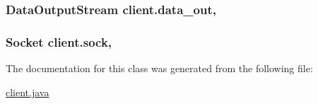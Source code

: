 \subsubsection[{\texorpdfstring{data\+\_\+out}{data_out}}]{\setlength{\rightskip}{0pt plus 5cm}Data\+Output\+Stream client.\+data\+\_\+out\hspace{0.3cm}{\ttfamily [static]}, {\ttfamily [package]}}\hypertarget{classclient_acbc6dbd1e4fdae9a97ebed689becebe3}{}\label{classclient_acbc6dbd1e4fdae9a97ebed689becebe3}
\subsubsection[{\texorpdfstring{sock}{sock}}]{\setlength{\rightskip}{0pt plus 5cm}Socket client.\+sock\hspace{0.3cm}{\ttfamily [static]}, {\ttfamily [package]}}\hypertarget{classclient_aa3824a2769efc0e44d38072df4107774}{}\label{classclient_aa3824a2769efc0e44d38072df4107774}


The documentation for this class was generated from the following file\+:\begin{DoxyCompactItemize}
\item 
\hyperlink{client_8java}{client.\+java}\end{DoxyCompactItemize}

